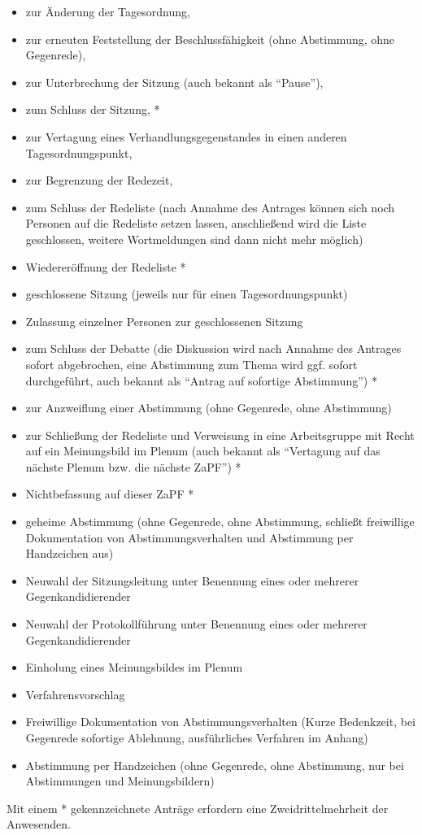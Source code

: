\documentclass[
  a4paper,
  oneside]{scrartcl}
\providecommand{\tightlist}{%
  \setlength{\itemsep}{0pt}\setlength{\parskip}{0pt}}
\begin{document}
\begin{enumerate}
  \begin{itemize}
  \tightlist
  \item
    zur Änderung der Tagesordnung,
  \item
    zur erneuten Feststellung der Beschlussfähigkeit (ohne Abstimmung,
    ohne Gegenrede),
  \item
    zur Unterbrechung der Sitzung (auch bekannt als ``Pause''),
  \item
    zum Schluss der Sitzung, *
  \item
    zur Vertagung eines Verhandlungsgegenstandes in einen anderen
    Tagesordnungspunkt,
  \item
    zur Begrenzung der Redezeit,
  \item
    zum Schluss der Redeliste (nach Annahme des Antrages können sich
    noch Personen auf die Redeliste setzen lassen, anschließend wird die
    Liste geschlossen, weitere Wortmeldungen sind dann nicht mehr
    möglich)
  \item
    Wiedereröffnung der Redeliste *
  \item
    geschlossene Sitzung (jeweils nur für einen Tagesordnungspunkt)
  \item
    Zulassung einzelner Personen zur geschlossenen Sitzung
  \item
    zum Schluss der Debatte (die Diskussion wird nach Annahme des
    Antrages sofort abgebrochen, eine Abstimmung zum Thema wird ggf.
    sofort durchgeführt, auch bekannt als ``Antrag auf sofortige
    Abstimmung'') *
  \item
    zur Anzweiflung einer Abstimmung (ohne Gegenrede, ohne Abstimmung)
  \item
    zur Schließung der Redeliste und Verweisung in eine Arbeitsgruppe
    mit Recht auf ein Meinungsbild im Plenum (auch bekannt als
    ``Vertagung auf das nächste Plenum bzw. die nächste ZaPF'') *
  \item
    Nichtbefassung auf dieser ZaPF *
  \item
    geheime Abstimmung (ohne Gegenrede, ohne Abstimmung, schließt
    freiwillige Dokumentation von Abstimmungsverhalten und Abstimmung
    per Handzeichen aus)
  \item
    Neuwahl der Sitzungsleitung unter Benennung eines oder mehrerer
    Gegenkandidierender
  \item
    Neuwahl der Protokollführung unter Benennung eines oder mehrerer
    Gegenkandidierender
  \item
    Einholung eines Meinungsbildes im Plenum
  \item
    Verfahrensvorschlag
  \item
    Freiwillige Dokumentation von Abstimmungsverhalten (Kurze
    Bedenkzeit, bei Gegenrede sofortige Ablehnung, ausführliches
    Verfahren im Anhang)
  \item
    Abstimmung per Handzeichen (ohne Gegenrede, ohne Abstimmung, nur bei
    Abstimmungen und Meinungsbildern)
  \end{itemize}

  Mit einem * gekennzeichnete Anträge erfordern eine Zweidrittelmehrheit
  der Anwesenden.
\end{enumerate}
\end{document}
